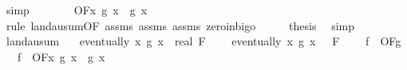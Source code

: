 \begin{isabellebody}
\ simp\isanewline
\ \ \isamarkupfalse%
\ \isamarkupfalse%
\ {\isachardoublequoteopen}{\isachardot}{\kern0pt}{\isachardot}{\kern0pt}{\isachardot}{\kern0pt}\ {\isasymin}\ O{\isacharbrackleft}{\kern0pt}F{\isacharprime}{\kern0pt}{\isacharbrackright}{\kern0pt}{\isacharparenleft}{\kern0pt}{\isasymlambda}x{\isachardot}{\kern0pt}\ g{}\ x\ {\isacharplus}{\kern0pt}\ g{}\ x{\isacharparenright}{\kern0pt}{\isachardoublequoteclose}\isanewline
\ \ \ \ \isamarkupfalse%
\ {\isacharparenleft}{\kern0pt}rule\ landau{\isacharunderscore}{\kern0pt}sum{\isacharbrackleft}{\kern0pt}OF\ assms{\isacharparenleft}{\kern0pt}{}{\isacharparenright}{\kern0pt}\ assms{\isacharparenleft}{\kern0pt}{}{\isacharparenright}{\kern0pt}\ assms{\isacharparenleft}{\kern0pt}{}{\isacharparenright}{\kern0pt}\ zero{\isacharunderscore}{\kern0pt}in{\isacharunderscore}{\kern0pt}bigo{\isacharbrackright}{\kern0pt}{\isacharparenright}{\kern0pt}\isanewline
\ \ \isamarkupfalse%
\ \isamarkupfalse%
\ {\isacharquery}{\kern0pt}thesis\ \isamarkupfalse%
\ simp\isanewline
{}\isamarkupfalse%
%
\endisatagproof
{\isafoldproof}%
%
\isadelimproof
\isanewline
%
\endisadelimproof
\isanewline
{}\isamarkupfalse%
\ landau{\isacharunderscore}{\kern0pt}sum{\isacharunderscore}{\kern0pt}{}{\isacharcolon}{\kern0pt}\isanewline
\ \ \ {\isachardoublequoteopen}eventually\ {\isacharparenleft}{\kern0pt}{\isasymlambda}x{\isachardot}{\kern0pt}\ g{}\ x\ {\isasymge}\ {\isacharparenleft}{\kern0pt}{}{\isacharcolon}{\kern0pt}{\isacharcolon}{\kern0pt}real{\isacharparenright}{\kern0pt}{\isacharparenright}{\kern0pt}\ F{\isacharprime}{\kern0pt}{\isachardoublequoteclose}\ \isanewline
\ \ \ {\isachardoublequoteopen}eventually\ {\isacharparenleft}{\kern0pt}{\isasymlambda}x{\isachardot}{\kern0pt}\ g{}\ x\ {\isasymge}\ {}{\isacharparenright}{\kern0pt}\ F{\isacharprime}{\kern0pt}{\isachardoublequoteclose}\ \isanewline
\ \ \ {\isachardoublequoteopen}f\ {\isasymin}\ O{\isacharbrackleft}{\kern0pt}F{\isacharprime}{\kern0pt}{\isacharbrackright}{\kern0pt}{\isacharparenleft}{\kern0pt}g{}{\isacharparenright}{\kern0pt}{\isachardoublequoteclose}\isanewline
\ \ \ {\isachardoublequoteopen}f\ {\isasymin}\ O{\isacharbrackleft}{\kern0pt}F{\isacharprime}{\kern0pt}{\isacharbrackright}{\kern0pt}{\isacharparenleft}{\kern0pt}{\isasymlambda}x{\isachardot}{\kern0pt}\ g{}\ x\ {\isacharplus}{\kern0pt}\ g{}\ x{\isacharparenright}{\kern0pt}{\isachardoublequoteclose}\isanewline

\end{isabellebody}
